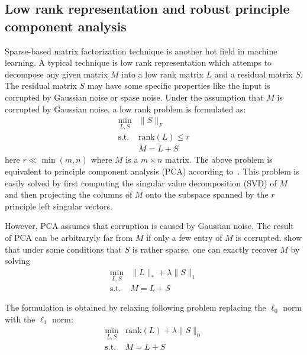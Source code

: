 \subsection{Low rank representation and robust principle component analysis}
Sparse-based matrix factorization technique is another hot field in machine learning.
A typical technique is low rank representation which attemps to decompose any given matrix $M$ into a low rank matrix $L$ and a residual matrix $S$.
The residual matrix $S$ may have some specific properties like the input is corrupted by Gaussian noise or spase noise.
Under the assumption that $M$ is corrupted by Gaussian noise, a low rank problem is formulated as:
\begin{equation}
\label{eq-lowrank}
\begin{array}{cl}
\min_{L,S} & \|S\|_F\\
\mathrm{s.t.} & \mathrm{rank}(L)\leq r\\
&M=L+S
\end{array}
\end{equation}
here $r\ll \min(m,n)$ where $M$ is a $m\times n$ matrix.
The above problem is equivalent to principle component analysis (PCA) according to~\cite{jolliffe2005principal,wold1987principal}.
This problem is easily solved by first computing the singular value decomposition (SVD) of $M$ and then projecting the columns of $M$ onto the subspace spanned by the $r$ principle left singular vectors.

However, PCA assumes that corruption is caused by Gaussian noise.
The result of PCA can be arbitraryly far from $M$ if only a few entry of $M$ is corrupted.
\cite{wright2009robust,candes2011robust} show that under some conditions that $S$ is rather sparse, one can exactly recover $M$ by solving
\begin{equation}
\label{eq-lowranksparse}
\begin{array}{cl}
\min_{L,S} & \|L\|_* + \lambda \|S\|_1 \\
\mathrm{s.t.} & M = L+S
\end{array}
\end{equation}

The formulation is obtained by relaxing following problem replacing the $\ell_0$ norm with the $\ell_1$ norm:
\begin{equation}
\label{eq-lowrankorigin}
\begin{array}{cl}
\min_{L,S} & \mathrm{rank}(L) + \lambda \|S\|_0 \\
\mathrm{s.t.} & M = L+S
\end{array}
\end{equation}

